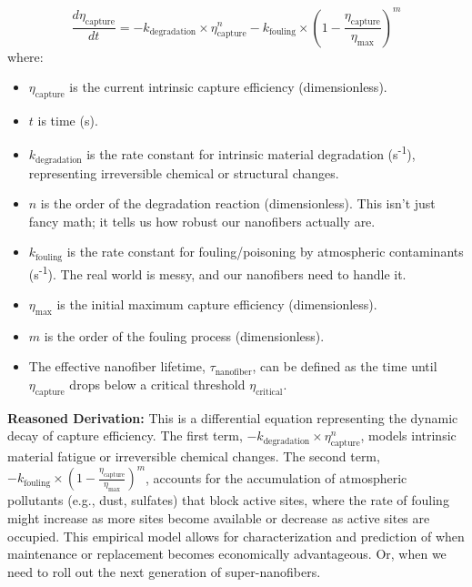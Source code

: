\documentclass[12pt]{article}
\begin{document}
\begin{equation}
\frac{d\eta_{\text{capture}}}{dt} = - k_{\text{degradation}} \times \eta_{\text{capture}}^n - k_{\text{fouling}} \times \left(1 - \frac{\eta_{\text{capture}}}{\eta_{\text{max}}}\right)^m
\label{eq:degradation_rate}
\end{equation}
where:
\begin{itemize}
    \item \(\eta_{\text{capture}}\) is the current intrinsic capture efficiency (dimensionless).
    \item \(t\) is time (s).
    \item \(k_{\text{degradation}}\) is the rate constant for intrinsic material degradation (s\textsuperscript{-1}), representing irreversible chemical or structural changes.
    \item \(n\) is the order of the degradation reaction (dimensionless). This isn't just fancy math; it tells us how robust our nanofibers actually are.
    \item \(k_{\text{fouling}}\) is the rate constant for fouling/poisoning by atmospheric contaminants (s\textsuperscript{-1}). The real world is messy, and our nanofibers need to handle it.
    \item \(\eta_{\text{max}}\) is the initial maximum capture efficiency (dimensionless).
    \item \(m\) is the order of the fouling process (dimensionless).
\item The effective nanofiber lifetime, \(\tau_{\text{nanofiber}}\), can be defined as the time until \(\eta_{\text{capture}}\) drops below a critical threshold \(\eta_{\text{critical}}\).
\end{itemize}

\textbf{Reasoned Derivation:} This is a differential equation representing the dynamic decay of capture efficiency. The first term, \(- k_{\text{degradation}} \times \eta_{\text{capture}}^n\), models intrinsic material fatigue or irreversible chemical changes. The second term, \(- k_{\text{fouling}} \times \left(1 - \frac{\eta_{\text{capture}}}{\eta_{\text{max}}}\right)^m\), accounts for the accumulation of atmospheric pollutants (e.g., dust, sulfates) that block active sites, where the rate of fouling might increase as more sites become available or decrease as active sites are occupied. This empirical model allows for characterization and prediction of when maintenance or replacement becomes economically advantageous. Or, when we need to roll out the next generation of super-nanofibers.
\end{document}
